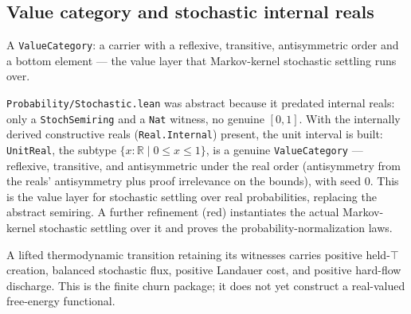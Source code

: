 \subsection{Value category and stochastic internal reals}

\begin{proposition}\label{thm:value-category}\leanok{}
A \texttt{ValueCategory}: a carrier with a reflexive, transitive, antisymmetric order and a bottom element --- the value layer that Markov-kernel stochastic settling runs over.
\end{proposition}

\begin{theorem}\label{thm:real-stochastic-interval-value-category}\leanok{}
\texttt{Probability/Stochastic.lean} was abstract because it predated internal reals: only a
\texttt{StochSemiring} and a \texttt{Nat} witness, no genuine $[0,1]$. With the internally derived
constructive reals (\texttt{Real.Internal}) present, the unit interval is built: \texttt{UnitReal},
the subtype $\{x:\mathbb{R} \mid 0\le x\le 1\}$, is a genuine \texttt{ValueCategory} --- reflexive,
transitive, and antisymmetric under the real order (antisymmetry from the reals' antisymmetry plus
proof irrelevance on the bounds), with seed $0$. This is the value layer for stochastic settling
over real probabilities, replacing the abstract semiring. A further refinement (red) instantiates the
actual Markov-kernel stochastic settling over it and proves the probability-normalization laws.
\end{theorem}

\begin{theorem}\label{thm:finite-thermodynamic-transition-production}\leanok{}
A lifted thermodynamic transition retaining its witnesses carries positive
held-\(\top\) creation, balanced stochastic flux, positive Landauer cost, and
positive hard-flow discharge.  This is the finite churn package; it does not yet
construct a real-valued free-energy functional.
\end{theorem}

